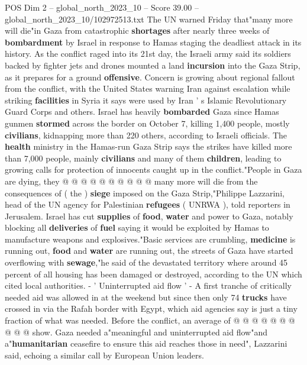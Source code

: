 \begin{textsample}{POS Dim 2 – global\_north\_2023\_10 – Score 39.00 – global\_north\_2023\_10/102972513.txt}  \label{ex:f2_pos_282}
The UN warned Friday that"many more will die"in Gaza from catastrophic \textbf{shortages} after nearly three weeks of \textbf{bombardment} by Israel in response to Hamas staging the deadliest attack in its history.
As the conflict raged into its 21st day, the Israeli army said its soldiers backed by fighter jets and drones mounted a land \textbf{incursion} into the Gaza Strip, as it prepares for a ground \textbf{offensive}.
Concern is growing about regional fallout from the conflict, with the United States warning Iran against escalation while striking \textbf{facilities} in Syria it says were used by Iran ' s Islamic Revolutionary Guard Corps and others.
Israel has heavily \textbf{bombarded} Gaza since Hamas gunmen \textbf{stormed} across the border on October 7, killing 1,400 people, mostly \textbf{civilians}, kidnapping more than 220 others, according to Israeli officials.
The \textbf{health} ministry in the Hamas-run Gaza Strip says the strikes have killed more than 7,000 people, mainly \textbf{civilians} and many of them \textbf{children}, leading to growing calls for protection of innocents caught up in the conflict."People in Gaza are dying, they @ @ @ @ @ @ @ @ @ @ many more will die from the consequences of ( the ) \textbf{siege} imposed on the Gaza Strip,"Philippe Lazzarini, head of the UN agency for Palestinian \textbf{refugees} ( UNRWA ), told reporters in Jerusalem.
Israel has cut \textbf{supplies} of \textbf{food}, \textbf{water} and power to Gaza, notably blocking all \textbf{deliveries} of \textbf{fuel} saying it would be exploited by Hamas to manufacture weapons and explosives."Basic services are crumbling, \textbf{medicine} is running out, \textbf{food} and \textbf{water} are running out, the streets of Gaza have started overflowing with \textbf{sewage},"he said of the devastated territory where around 45 percent of all housing has been damaged or destroyed, according to the UN which cited local authorities. - ' Uninterrupted aid flow ' - A first tranche of critically needed aid was allowed in at the weekend but since then only 74 \textbf{trucks} have crossed in via the Rafah border with Egypt, which aid agencies say is just a tiny fraction of what was needed.
Before the conflict, an average of @ @ @ @ @ @ @ @ @ @ show.
Gaza needed a"meaningful and uninterrupted aid flow"and a"\textbf{humanitarian} ceasefire to ensure this aid reaches those in need", Lazzarini said, echoing a similar call by European Union leaders.

\end{textsample}
